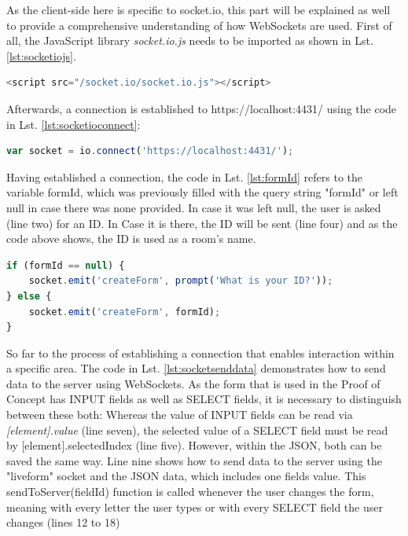 As the client-side here is specific to socket.io, this part will be explained as well to provide a comprehensive understanding of how WebSockets are used. First of all, the JavaScript library \textit{socket.io.js} needs to be imported as shown in Lst. \ref{lst:socketiojs}.

\begin{lstlisting}[language=javascript,caption={Including the client-side socket.io JavaScript},label=lst:socketiojs]
<script src="/socket.io/socket.io.js"></script>
\end{lstlisting}

Afterwards, a connection is established to https://localhost:4431/ using the code in Lst. \ref{lst:socketioconnect}:

\begin{lstlisting}[language=javascript,caption={Establishing socket.io connection from the client-side},label=lst:socketioconnect]
var socket = io.connect('https://localhost:4431/');
\end{lstlisting}

Having established a connection, the code in Lst. \ref{lst:formId} refers to the variable formId, which was previously filled with the query string "formId" or left null in case there was none provided. In case it was left null, the user is asked (line two) for an ID. In Case it is there, the ID will be sent (line four) and as the code above shows, the ID is used as a room's name.

\begin{lstlisting}[language=javascript,caption={Joining a specific area – "room"},label=lst:formId]
if (formId == null) {
	socket.emit('createForm', prompt('What is your ID?'));
} else {
	socket.emit('createForm', formId);
}
\end{lstlisting}

So far to the process of establishing a connection that enables interaction within a specific area. The code in Lst. \ref{lst:socketsenddata} demonstrates how to send data to the server using WebSockets. As the form that is used in the Proof of Concept has INPUT fields as well as SELECT fields, it is necessary to distinguish between these both: Whereas the value of INPUT fields can be read via \textit{[element].value} (line seven), the selected value of a SELECT field must be read by [element].selectedIndex (line five). However, within the JSON, both can be saved the same way. Line nine shows how to send data to the server using the "liveform" socket and the JSON data, which includes one fields value. This sendToServer(fieldId) function is called whenever the user changes the form, meaning with every letter the user types or with every SELECT field the user changes (lines 12 to 18)

